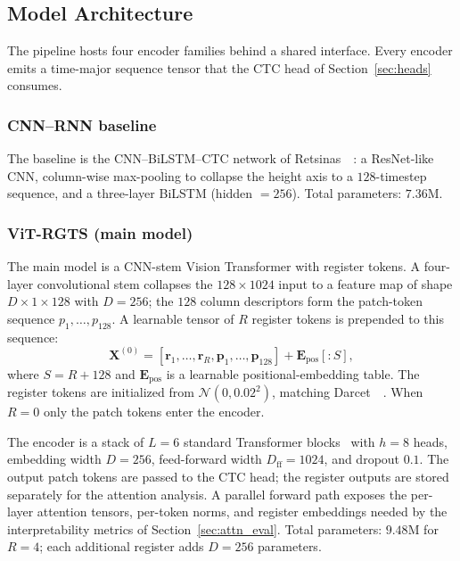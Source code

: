 \subsection{Model Architecture}
\label{sec:arch}

The pipeline hosts four encoder families behind a shared interface. Every encoder emits a time-major sequence tensor that the CTC head of Section~\ref{sec:heads} consumes.

\subsubsection{CNN--RNN baseline}

The baseline is the CNN--BiLSTM--CTC network of Retsinas~\etal~\cite{retsinas2024htrbestpractices}: a ResNet-like CNN, column-wise max-pooling to collapse the height axis to a $128$-timestep sequence, and a three-layer BiLSTM (hidden $= 256$). Total parameters: $7.36$M.

\subsubsection{ViT-RGTS (main model)}

The main model is a CNN-stem Vision Transformer with register tokens. A four-layer convolutional stem collapses the $128 \times 1024$ input to a feature map of shape $D \times 1 \times 128$ with $D = 256$; the $128$ column descriptors form the patch-token sequence $p_1, \ldots, p_{128}$. A learnable tensor of $R$ register tokens is prepended to this sequence:
\begin{equation}
\label{eq:token_sequence}
\mathbf{X}^{(0)} = [\mathbf{r}_1, \ldots, \mathbf{r}_R, \mathbf{p}_1, \ldots, \mathbf{p}_{128}] + \mathbf{E}_{\mathrm{pos}}[:S],
\end{equation}
where $S = R + 128$ and $\mathbf{E}_{\mathrm{pos}}$ is a learnable positional-embedding table. The register tokens are initialized from $\mathcal{N}(0, 0.02^2)$, matching Darcet~\etal~\cite{darcet2024registers}. When $R = 0$ only the patch tokens enter the encoder.

The encoder is a stack of $L = 6$ standard Transformer blocks~\cite{vaswani2017attention} with $h = 8$ heads, embedding width $D = 256$, feed-forward width $D_{\mathrm{ff}} = 1024$, and dropout $0.1$. The output patch tokens are passed to the CTC head; the register outputs are stored separately for the attention analysis. A parallel forward path exposes the per-layer attention tensors, per-token norms, and register embeddings needed by the interpretability metrics of Section~\ref{sec:attn_eval}. Total parameters: $9.48$M for $R = 4$; each additional register adds $D = 256$ parameters.

